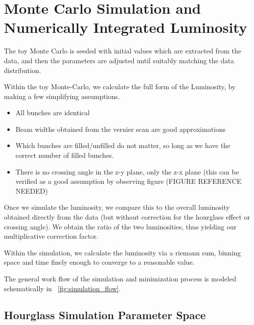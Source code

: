 \section{Monte Carlo Simulation and Numerically Integrated Luminosity}
The toy Monte Carlo is seeded with initial values which are extracted from the
data, and then the parameters are adjusted until suitably matching the data
distribution.

Within the toy Monte-Carlo, we calculate the full form of the Luminosity, by
making a few simplifying assumptions.

\begin{itemize}
  \item All bunches are identical
  \item Beam widths obtained from the vernier scan are good approximations
  \item Which bunches are filled/unfilled do not matter, so long as we have the
	correct number of filled bunches.
  \item There is no crossing angle in the z-y plane, only the z-x plane (this
	  can be verified as a good assumption by observing figure (FIGURE
	  REFERENCE NEEDED)
\end{itemize}

Once we simulate the luminosity, we compare this to the overall luminosity
obtained directly from the data (but without correction for the hourglass effect
or crossing angle). We obtain the ratio of the two luminosities, thus yielding
our multiplicative correction factor.

Within the simulation, we calculate the luminosity via a riemann sum, binning
space and time finely enough to converge to a reasonable value.

The general work flow of the simulation and minimization process is modeled
schematically in ~\ref{fig:simulation_flow}. 


\clearpage







\clearpage

\subsection{Hourglass Simulation Parameter Space}

